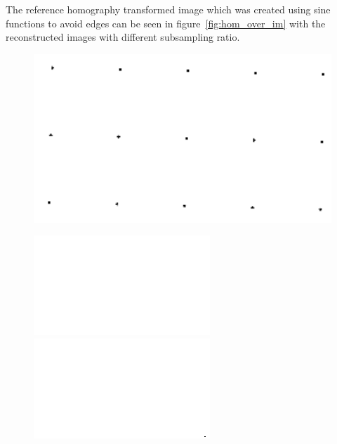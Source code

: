 The reference homography transformed image which was created using sine functions to avoid edges can be seen in figure~\ref{fig:hom_over_im} with the reconstructed images with different subsampling ratio.   


\begin{figure}[H]
    \centering
\begin{minipage}[h]{0.3\textwidth}
	\vspace*{1cm}
    \includegraphics[width=1\textwidth]{result/hom/im_ref.png}
    \label{fig:hom_ref}
\end{minipage}
\begin{minipage}[t]{0.22\textwidth}
    \includegraphics[width = \textwidth]{result/hom/im_m5.png}
    \label{fig:hom_5}
    \includegraphics[width = \textwidth]{result/hom/im_m20.png}

\end{minipage}
\end{figure}
